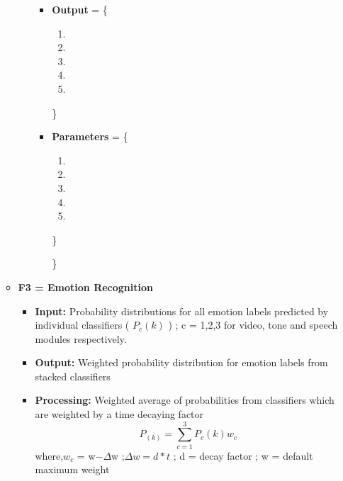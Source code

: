 \documentclass[oneside,a4paper,12pt]{report}
\begin{document}
\begin{normalsize}
\begin{itemize}
\begin{itemize}
\begin{itemize}
\begin{itemize}
		\item \textbf{Output} = \{ 
		\begin{enumerate}
			\item 
			\item
			\item
			\item
			\item
		\end{enumerate}  \}
		
		\item \textbf{Parameters} = \{ 
		\begin{enumerate}
			\item 
			\item
			\item
			\item
			\item
		\end{enumerate}  \}
		
		\}
	\end{itemize}
	\end{itemize}
		
\vspace{4mm}
	\item \textbf{F3 = Emotion Recognition}\\
	\begin{itemize}
		\item \textbf{Input: } Probability distributions for all emotion labels predicted by individual classifiers ( \( P_c(k) \) ) ; c = 1,2,3 for video, tone and speech modules respectively.
		\newline
		\item \textbf{Output: } Weighted probability distribution for emotion labels from stacked classifiers
		\newline
		\item \textbf{Processing: } Weighted average of probabilities from classifiers which are weighted by a time decaying factor
		\begin{equation}
		P_{(k)} = \sum_{c=1}^{3} P_c(k) w_c
		\end{equation}
		where,\newline \(w_c\) = w\( - \Delta\)w ;\newline \(\Delta w = d * t\) ; \newline d = decay factor ; \newline w = default maximum weight
	\end{itemize}
\end{itemize}
\end{itemize}
\newpage



\end{normalsize}
\end{document}
